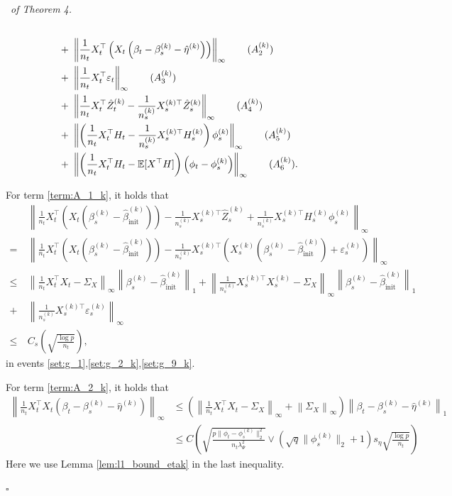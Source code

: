 \documentclass[12pt]{article}
\newenvironment{pf}{{\noindent \it Proof}\ }{\hfill $\square$\par}
\begin{document}
\begin{pf}{\it of Theorem 4. }
\begin{align}
        \\ +\ & 
        \left\|\frac{1}{n_t}X_t^\top\left(X_t\left(\beta_t - \beta_s^{(k)}- \hat{\eta}^{(k)}\right)\right) \right\|_{\infty}\label{term:A_2_k} \tag{$A_2^{(k)}$}
        \\ + \ & \left\|\frac{1}{n_t}X_t^\top \varepsilon_t \right\|_{\infty}\label{term:A_3_k} \tag{$A_3^{(k)}$}
        \\ + \ & \left\|\frac{1}{n_t}X_t^\top \hat{Z}^{(k)}_t -  \frac{1}{n_s^{(k)}}X_s^{(k)\top}\hat{Z}_s^{(k)}\right\|_{\infty} 
        \label{term:A_4_k} \tag{$A_4^{(k)}$}
        \\ + \ & \left\|\left(\frac{1}{n_t}X_t^\top H_t - \frac{1}{n_s^{(k)}} X_s^{(k)\top}H_s^{(k)}\right)\phi_s^{(k)}\right\|_{\infty}  \label{term:A_5_k} \tag{$A_5^{(k)}$}
        \\ + \ & \left\|\left(\frac{1}{n_t}X_t^\top H_t - \mathbb{E}[X^\top H]\right)\left(\phi_t -\phi_s^{(k)}\right)\right\|_{\infty}\label{term:A_6_k} \tag{$A_6^{(k)}$}. 
    \end{align}

    For term \ref{term:A_1_k}, it holds that 
    \begin{align*}
        & \left\|\frac{1}{n_t}X_t^\top\left(X_t\left(\beta_s^{(k)} - \hat{\beta}_{\text{init}}^{(k)}\right)\right) - \frac{1}{n_s^{(k)}}X_s^{(k)\top}\hat{Z}_s^{(k)}+\frac{1}{n_s^{(k)}} X_s^{(k)\top}H_s^{(k)}\phi_s^{(k)}\right\|_{\infty} \\=\ &   \left\|\frac{1}{n_t}X_t^\top\left(X_t\left(\beta_s^{(k)} - \hat{\beta}_{\text{init}}^{(k)}\right)\right) - \frac{1}{n_s^{(k)}}X_s^{(k)\top}\left(X_s^{(k)}\left(\beta_s^{(k)}- \hat{\beta}_{\text{init}}^{(k)}\right)+ \varepsilon_s^{(k)}\right)\right\|_{\infty}
        \\\le \ & 
         \left\|\frac{1}{n_t}X_t^\top X_t - \Sigma_X\right\|_{\infty}\left\|\beta_s^{(k)} - \hat{\beta}_{\text{init}}^{(k)}\right\|_{1} + \left\|\frac{1}{n_s^{(k)}}X_s^{(k)\top}X_s^{(k)} - \Sigma_X\right\|_{\infty}\left\|\beta_s^{(k)}- \hat{\beta}_{\text{init}}^{(k)}\right\|_{1}\\+ \ & 
         \left\|\frac{1}{n_s^{(k)}}X_s^{(k)\top}\varepsilon_s^{(k)}\right\|_{\infty}
         \\\le \ & 
         C_s\left(\sqrt{\frac{\log p}{n_t}}\right),
    \end{align*}
    in events \ref{set:g_1},\ref{set:g_2_k},\ref{set:g_9_k}. 

    For term \ref{term:A_2_k}, it holds that 
    \begin{align*}
        \left\|\frac{1}{n_t}X_t^\top X_t\left(\beta_t - \beta_s^{(k)}- \hat{\eta}^{(k)}\right)\right\|_{\infty} & \le \left(\left\|\frac{1}{n_t}X_t^\top X_t - \Sigma_X\right\|_{\infty} +\left\|\Sigma_X\right\|_{\infty}\right) \left\|\beta_t - \beta_s^{(k)} - \hat{\eta}^{(k)}\right\|_{1}
        \\& \le 
        C\left(\sqrt{\frac{p\|\phi_t-\phi_s^{(k)}\|^2_2}{n_t \lambda_\Psi^2}}\vee \left(\sqrt{q}\|\phi_s^{(k)}\|_2 +1\right)s_\eta\sqrt{\frac{\log p}{n_t}}\right)
    \end{align*}
    Here we use Lemma \ref{lem:l1_bound_etak} in the last inequality. 
    

\end{pf}
\end{document}

